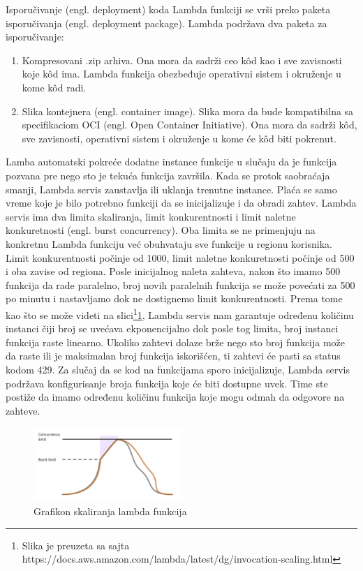 \documentclass[12pt,oneside]{memoir}
\begin{document}
Isporučivanje (engl. deployment) koda Lambda funkciji se vrši preko paketa isporučivanja (engl. deployment package). Lambda podržava dva paketa za isporučivanje:
\begin{enumerate}
  \item Kompresovani .zip arhiva. Ona mora da sadrži ceo kôd kao i sve zavisnosti koje kôd ima. Lambda funkcija obezbeđuje operativni sistem i okruženje u kome kôd radi.
  \item Slika kontejnera (engl. container image). Slika mora da bude kompatibilna sa specifikaciom OCI (engl. Open Container Initiative). Ona mora da sadrži kôd, sve zavisnosti, operativni sistem i okruženje u kome će kôd biti pokrenut.
\end{enumerate}
 
Lamba automatski pokreće dodatne instance funkcije u slučaju da je funkcija pozvana pre nego sto je tekuća funkcija završila. Kada se protok saobraćaja smanji, Lambda servis zaustavlja ili uklanja trenutne instance. Plaća se samo vreme koje je bilo potrebno funkciji da se inicijalizuje i da obradi zahtev. Lambda servis ima dva limita skaliranja, limit konkurentnosti i limit naletne konkuretnosti (engl. burst concurrency). Oba limita se ne primenjuju na konkretnu Lambda funkciju već obuhvataju sve funkcije u regionu korisnika. Limit konkurentnosti počinje od 1000, limit naletne konkuretnosti počinje od 500 i oba zavise od regiona. Posle inicijalnog naleta zahteva, nakon što imamo 500 funkcija da rade paralelno, broj novih paralelnih funkcija se može povećati za 500 po minutu i nastavljamo dok ne dostignemo limit konkurentnosti. Prema tome kao što se može videti na slici\footnote{Slika je preuzeta sa sajta https://docs.aws.amazon.com/lambda/latest/dg/invocation-scaling.html}\ref{fig:awsLambdaSkaliranje}, Lambda servis nam garantuje određenu količinu instanci čiji broj se uvećava ekponencijalno dok posle tog limita, broj instanci funkcija raste linearno. Ukoliko zahtevi dolaze brže nego sto broj funkcija može da raste ili je maksimalan broj funkcija iskorišćen, ti zahtevi će pasti sa status kodom 429. Za slučaj da se kod na funkcijama sporo inicijalizuje, Lambda servis podržava konfigurisanje broja funkcija koje će biti dostupne uvek. Time ste postiže da imamo određenu količinu funkcija koje mogu odmah da odgovore na zahteve.
 

\begin{figure}[!ht]
  \centering
  \includegraphics[width=0.5\textwidth]{AWS-Lambda-skaliranje.png}
  \caption{Grafikon skaliranja lambda funkcija}
  \label{fig:awsLambdaSkaliranje}
\end{figure}
 
\end{document}
